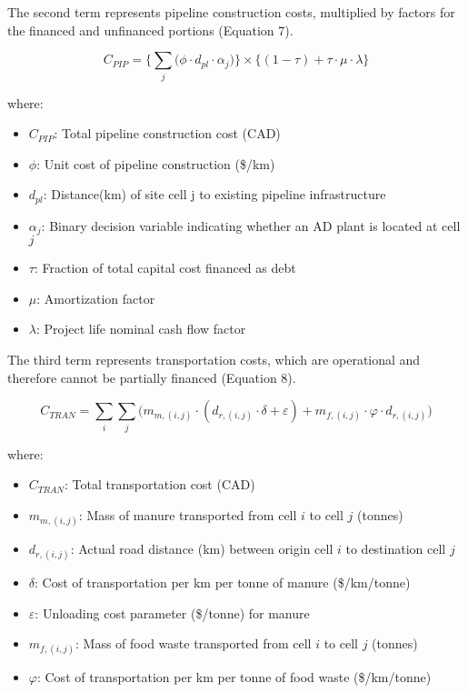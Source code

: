 \documentclass[12pt]{article}
\begin{document}
The second term represents pipeline construction costs, multiplied by factors for the financed and unfinanced portions (Equation 7).

\begin{equation}
  C_{PIP} = \biggl\{\sum_{j} \bigl( \phi \cdot d_{pl} \cdot \alpha_j \bigr)\biggr\} \times \{(1 - \tau) + \tau \cdot \mu \cdot \lambda\}
\end{equation}

where:
\begin{itemize}
  \item $C_{PIP}$: Total pipeline construction cost (CAD)
  \item $\phi$: Unit cost of pipeline construction (\$/km)
  \item $d_{pl}$: Distance(km) of site cell j to existing pipeline infrastructure
  \item $\alpha_j$: Binary decision variable indicating whether an AD plant is located at cell $j$
  \item $\tau$: Fraction of total capital cost financed as debt
  \item $\mu$: Amortization factor
  \item $\lambda$: Project life nominal cash flow factor
\end{itemize}

The third term represents transportation costs, which are operational and therefore cannot be partially financed (Equation 8).

\begin{equation}
  C_{TRAN} = \sum_{i}\sum_{j} \bigl(m_{m, (i,j)} \cdot (d_{r, (i, j)} \cdot \delta + \varepsilon) + m_{f, (i, j)} \cdot \varphi \cdot d_{r, (i,j)}\bigr)
\end{equation}

where:
\begin{itemize}
  \item $C_{TRAN}$: Total transportation cost (CAD)
  \item $m_{m, (i,j)}$: Mass of manure transported from cell $i$ to cell $j$ (tonnes)
  \item $d_{r, (i,j)}$: Actual road distance (km) between origin cell $i$ to destination cell $j$
  \item $\delta$: Cost of transportation per km per tonne of manure (\$/km/tonne)
  \item $\varepsilon$: Unloading cost parameter (\$/tonne) for manure
  \item $m_{f, (i,j)}$: Mass of food waste transported from cell $i$ to cell $j$ (tonnes)
  \item $\varphi$: Cost of transportation per km per tonne of food waste (\$/km/tonne)
\end{itemize}
\end{document}

